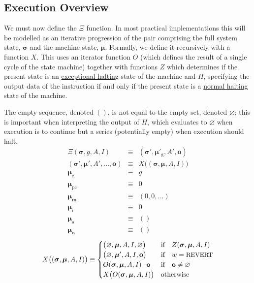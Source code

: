 \documentclass[9pt,oneside]{amsart}
\makeatletter
\newcommand{\linkdest}[1]{\Hy@raisedlink{\hypertarget{#1}{}}}
\makeatother
\begin{document}
\begin{multicols}{2}
\subsection{Execution Overview}

\linkdest{xi_def}
We must now define the $\Xi$ function. In most practical implementations this will be modelled as an iterative progression of the pair comprising the full system state, $\boldsymbol{\sigma}$ and the machine state, $\boldsymbol{\mu}$. Formally, we define it recursively with a function $X$. This uses an iterator function $O$ (which defines the result of a single cycle of the state machine) together with functions \hyperlink{zhalt}{$Z$} which determines if the present state is an \hyperlink{zhalt}{exceptional halting} state of the machine and \hyperlink{hhalt}{$H$}, specifying the output data of the instruction if and only if the present state is a \hyperlink{hhalt}{normal halting} state of the machine.

\hypertarget{empty_sequence_vs_empty_set}{}The empty sequence, denoted $()$, is not equal to the empty set, denoted $\varnothing$; this is important when interpreting the output of $H$, which evaluates to $\varnothing$ when execution is to continue but a series (potentially empty) when execution should halt.
\begin{eqnarray}
\Xi(\boldsymbol{\sigma}, g, A, I) & \equiv & (\boldsymbol{\sigma}'\!, \boldsymbol{\mu}'_{\mathrm{g}}, A', \mathbf{o}) \\
(\boldsymbol{\sigma}', \boldsymbol{\mu}'\!, A', ..., \mathbf{o}) & \equiv & X\big((\boldsymbol{\sigma}, \boldsymbol{\mu}, A, I)\big) \\
\boldsymbol{\mu}_{\mathrm{g}} & \equiv & g \\
\boldsymbol{\mu}_{\mathrm{pc}} & \equiv & 0 \\
\boldsymbol{\mu}_{\mathbf{m}} & \equiv & (0, 0, ...) \\
\boldsymbol{\mu}_{\mathrm{i}} & \equiv & 0 \\
\boldsymbol{\mu}_{\mathbf{s}} & \equiv & () \\
\boldsymbol{\mu}_{\mathbf{o}} & \equiv & ()
\end{eqnarray}
\begin{equation} \label{eq:X-def}
X\big( (\boldsymbol{\sigma}, \boldsymbol{\mu}, A, I) \big) \equiv \begin{cases}
\big(\varnothing, \boldsymbol{\mu}, A, I, \varnothing\big) & \text{if} \quad Z(\boldsymbol{\sigma}, \boldsymbol{\mu}, A, I) \\
\big(\varnothing, \boldsymbol{\mu}', A, I, \mathbf{o}\big) & \text{if} \quad w = \text{\small REVERT} \\
O(\boldsymbol{\sigma}, \boldsymbol{\mu}, A, I) \cdot \mathbf{o} & \text{if} \quad \mathbf{o} \neq \varnothing \\
X\big(O(\boldsymbol{\sigma}, \boldsymbol{\mu}, A, I)\big) & \text{otherwise} \\
\end{cases}
\end{equation}


\end{multicols}
\end{document}
